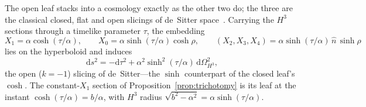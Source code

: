 \documentclass[11pt,a4paper]{article}
\theoremstyle{definition}
\newcommand{\dd}{\mathrm{d}}
\begin{document}
The open leaf stacks into a cosmology exactly as the other two do; the three are the classical closed, flat and open slicings of de~Sitter space~\cite{HawkingEllis1973}. Carrying the $H^{3}$ sections through a timelike parameter $\tau$, the embedding
\begin{equation}\label{eq:openembed}
X_{1}=\alpha\cosh(\tau/\alpha),\qquad
X_{0}=\alpha\sinh(\tau/\alpha)\cosh\rho,\qquad
(X_{2},X_{3},X_{4})=\alpha\sinh(\tau/\alpha)\,\hat{n}\,\sinh\rho
\end{equation}
lies on the hyperboloid and induces
\begin{equation}\label{eq:opends}
\dd s^{2}=-\dd\tau^{2}+\alpha^{2}\sinh^{2}(\tau/\alpha)\,\dd\Omega_{H^{3}}^{2},
\end{equation}
the open ($k=-1$) slicing of de~Sitter---the $\sinh$ counterpart of the closed leaf's $\cosh$. The constant-$X_{1}$ section of Proposition~\ref{prop:trichotomy} is its leaf at the instant $\cosh(\tau/\alpha)=b/\alpha$, with $H^{3}$ radius $\sqrt{b^{2}-\alpha^{2}}=\alpha\sinh(\tau/\alpha)$.
\end{document}
